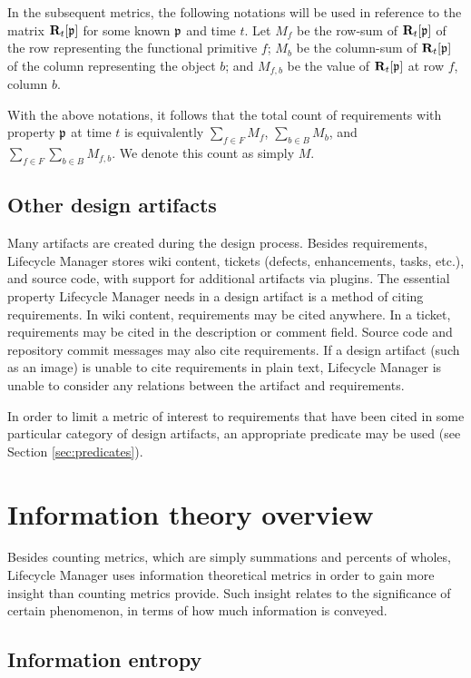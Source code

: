 \documentclass{article}
\begin{document}
In the subsequent metrics, the following notations will be used in
reference to the matrix $\mathbf{R}_t[\mathfrak{p}]$ for some known
$\mathfrak{p}$ and time $t$. Let $M_f$ be the row-sum of
$\mathbf{R}_t[\mathfrak{p}]$ of the row representing the functional primitive
$f$; $M_b$ be the column-sum of $\mathbf{R}_t[\mathfrak{p}]$ of the column
representing the object $b$; and $M_{f,b}$ be the value of
$\mathbf{R}_t[\mathfrak{p}]$ at row $f$, column $b$.

With the above notations, it follows that the total count of
requirements with property $\mathfrak{p}$ at time $t$ is equivalently
$\sum_{f \in F} M_f$, $\sum_{b \in B} M_b$, and $\sum_{f \in F}
\sum_{b \in B} M_{f,b}$. We denote this count as simply $M$.


\subsection{Other design artifacts}

Many artifacts are created during the design process. Besides
requirements, Lifecycle Manager stores wiki content, tickets (defects,
enhancements, tasks, etc.), and source code, with support for
additional artifacts via plugins. The essential property Lifecycle
Manager needs in a design artifact is a method of citing
requirements. In wiki content, requirements may be cited anywhere. In
a ticket, requirements may be cited in the description or comment
field. Source code and repository commit messages may also cite
requirements. If a design artifact (such as an image) is unable to
cite requirements in plain text, Lifecycle Manager is unable to
consider any relations between the artifact and requirements.

In order to limit a metric of interest to requirements that have been
cited in some particular category of design artifacts, an appropriate
predicate may be used (see Section \ref{sec:predicates}).


\section{Information theory overview}

Besides counting metrics, which are simply summations and percents of
wholes, Lifecycle Manager uses information theoretical metrics in
order to gain more insight than counting metrics provide. Such insight
relates to the significance of certain phenomenon, in terms of how
much information is conveyed.

\subsection{Information entropy}
\end{document}
